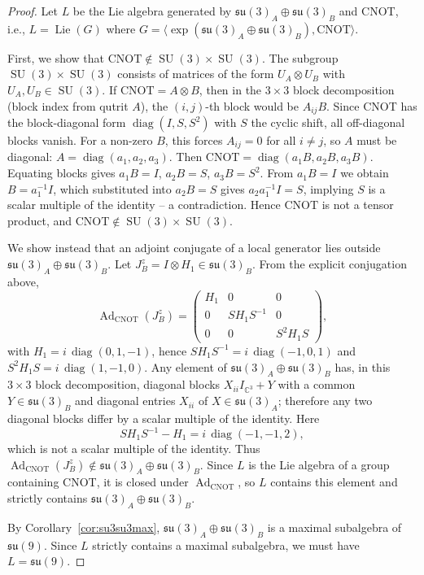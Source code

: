 \documentclass[12pt,a4paper]{article}
\newcommand{\Ad}{\operatorname{Ad}}
\newcommand{\Lie}{\operatorname{Lie}}
\newcommand{\SU}{\operatorname{SU}}
\begin{document}
\begin{proof}
Let $L$ be the Lie algebra generated by $\mathfrak{su}(3)_A \oplus
\mathfrak{su}(3)_B$ and CNOT, i.e., $L = \Lie(G)$ where
$G = \langle \exp(\mathfrak{su}(3)_A \oplus \mathfrak{su}(3)_B),
\text{CNOT} \rangle$.

First, we show that $\text{CNOT} \notin \SU(3) \times \SU(3)$. The subgroup
$\SU(3) \times \SU(3)$ consists of matrices of the form $U_A \otimes U_B$
with $U_A,U_B \in \SU(3)$. If $\text{CNOT} = A \otimes B$, then in the
$3\times 3$ block decomposition (block index from qutrit $A$), the
$(i,j)$-th block would be $A_{ij} B$. Since CNOT has the block-diagonal
form $\operatorname{diag}(I, S, S^2)$ with $S$ the cyclic shift, all
off-diagonal blocks vanish. For a non-zero $B$, this forces $A_{ij}=0$
for all $i \neq j$, so $A$ must be diagonal: $A = \operatorname{diag}(a_1,a_2,a_3)$.
Then $\text{CNOT} = \operatorname{diag}(a_1 B, a_2 B, a_3 B)$.
Equating blocks gives $a_1 B = I$, $a_2 B = S$, $a_3 B = S^2$.
From $a_1 B = I$ we obtain $B = a_1^{-1} I$, which substituted into
$a_2 B = S$ gives $a_2 a_1^{-1} I = S$, implying $S$ is a scalar
multiple of the identity -- a contradiction. Hence $\text{CNOT}$ is
not a tensor product, and $\text{CNOT} \notin \SU(3)\times\SU(3)$.

We show instead that an adjoint conjugate of a local generator lies
outside $\mathfrak{su}(3)_A \oplus \mathfrak{su}(3)_B$. Let
$J_B^z = I \otimes H_1 \in \mathfrak{su}(3)_B$. From the explicit
conjugation above,
\[
\Ad_{\text{CNOT}}(J_B^z)
= \begin{pmatrix} H_1 & 0 & 0 \\ 0 & S H_1 S^{-1} & 0 \\
0 & 0 & S^2 H_1 S \end{pmatrix},
\]
with $H_1 = i\,\operatorname{diag}(0,1,-1)$, hence
$S H_1 S^{-1} = i\,\operatorname{diag}(-1,0,1)$ and
$S^2 H_1 S = i\,\operatorname{diag}(1,-1,0)$. Any element of
$\mathfrak{su}(3)_A \oplus \mathfrak{su}(3)_B$ has, in this
$3\times 3$ block decomposition, diagonal blocks
$X_{ii} I_{\mathbb C^3} + Y$ with a common $Y \in \mathfrak{su}(3)_B$
and diagonal entries $X_{ii}$ of $X \in \mathfrak{su}(3)_A$; therefore any
two diagonal blocks differ by a scalar multiple of the identity. Here
\[
S H_1 S^{-1} - H_1
= i\,\operatorname{diag}(-1,-1,2),
\]
which is not a scalar multiple of the identity. Thus
$\Ad_{\text{CNOT}}(J_B^z) \notin \mathfrak{su}(3)_A \oplus
\mathfrak{su}(3)_B$. Since $L$ is the Lie algebra of a group containing
CNOT, it is closed under $\Ad_{\text{CNOT}}$, so $L$ contains this element
and strictly contains $\mathfrak{su}(3)_A \oplus \mathfrak{su}(3)_B$.

By Corollary~\ref{cor:su3su3max}, $\mathfrak{su}(3)_A \oplus
\mathfrak{su}(3)_B$ is a maximal subalgebra of $\mathfrak{su}(9)$.
Since $L$ strictly contains a maximal subalgebra, we must have
$L = \mathfrak{su}(9)$.
\end{proof}
\end{document}
